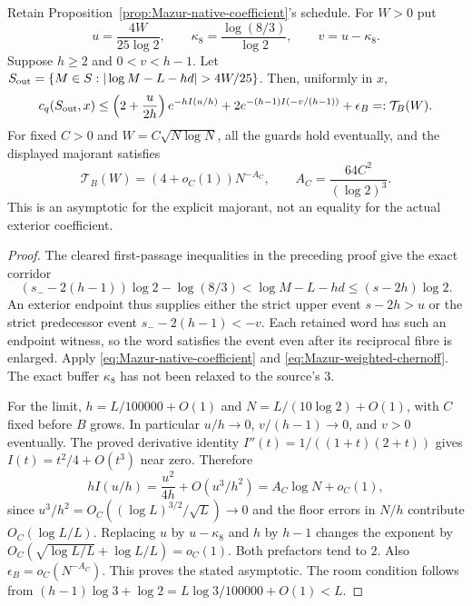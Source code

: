 \begin{corollary}
\label{cor:Mazur-exterior-coefficient}
Retain Proposition~\ref{prop:Mazur-native-coefficient}'s schedule.
For $W>0$ put
\[
 u=\frac{4W}{25\log2},\qquad
 \kappa_8=\frac{\log(8/3)}{\log2},\qquad v=u-\kappa_8.
\]
Suppose $h\ge2$ and $0<v<h-1$. Let
$S_{\rm out}=\{M\in S:|\log M-L-hd|>4W/25\}$.
Then, uniformly in $x$,
\begin{equation}
 c_q(S_{\rm out},x)\le
 \left(2+\frac{u}{2h}\right)e^{-hI(u/h)}
 +2e^{-(h-1)I(-v/(h-1))}+\epsilon_B
 =:\mathcal T_B(W).
 \label{eq:Mazur-exterior-finite}
\end{equation}
For fixed $C>0$ and $W=C\sqrt{N\log N}$, all the guards hold eventually,
and the displayed majorant satisfies
\begin{equation}
 \mathcal T_B(W)=(4+o_C(1))N^{-A_C},\qquad
 A_C=\frac{64C^2}{(\log2)^3}.
 \label{eq:Mazur-exterior-rate}
\end{equation}
This is an asymptotic for the explicit majorant, not an equality for
the actual exterior coefficient.
\end{corollary}
\begin{proof}
The cleared first-passage inequalities in the preceding proof give
the exact corridor
\[
 (s_--2(h-1))\log2-\log(8/3)
 <\log M-L-hd\le(s-2h)\log2 .
\]
An exterior endpoint thus supplies either the strict upper event
$s-2h>u$ or the strict predecessor event $s_--2(h-1)<-v$.
Each retained word has such an endpoint witness, so the word satisfies
the event even after its reciprocal fibre is enlarged.
Apply \eqref{eq:Mazur-native-coefficient} and
\eqref{eq:Mazur-weighted-chernoff}. The exact buffer $\kappa_8$
has not been relaxed to the source's $3$.

For the limit, $h=L/100000+O(1)$ and
$N=L/(10\log2)+O(1)$, with $C$ fixed before $B$ grows.
In particular $u/h\to0$, $v/(h-1)\to0$, and $v>0$ eventually.
The proved derivative identity $I''(t)=1/((1+t)(2+t))$ gives
$I(t)=t^2/4+O(t^3)$ near zero. Therefore
\[
 hI(u/h)=\frac{u^2}{4h}+O(u^3/h^2)
        =A_C\log N+o_C(1),
\]
since $u^3/h^2=O_C((\log L)^{3/2}/\sqrt L)\to0$ and the floor
errors in $N/h$ contribute $O_C(\log L/L)$.
Replacing $u$ by $u-\kappa_8$ and $h$ by $h-1$ changes the
exponent by $O_C(\sqrt{\log L/L}+\log L/L)=o_C(1)$.
Both prefactors tend to $2$. Also
$\epsilon_B=o_C(N^{-A_C})$. This proves the stated asymptotic.
The room condition follows from
$(h-1)\log3+\log2=L\log3/100000+O(1)<L$.
\end{proof}

